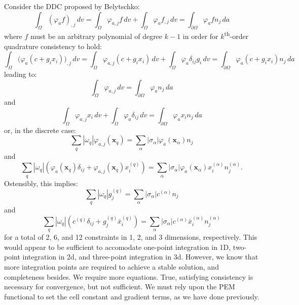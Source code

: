 \documentclass[11pt]{article} %
\begin{document}
Consider the DDC proposed by Belytschko:
\begin{equation}
	\int_{\Omega} (\varphi_{a} f)_{,j} \, dv = \int_{\Omega} \varphi_{a,j} f \, dv + \int_{\Omega} \varphi_{a} f_{,j} \, dv = \int_{\partial \Omega} \varphi_a f n_j \, da
\end{equation}
where $f$ must be an arbitrary polynomial of degree $k-1$ in order for $k$\textsuperscript{th}-order quadrature consistency to hold:
\begin{equation}
	\int_{\Omega} \big(\varphi_{a} (c + g_i x_i) \big)_{,j} \, dv = \int_{\Omega} \varphi_{a,j} (c + g_i x_i) \, dv + \int_{\Omega} \varphi_{a} \delta_{ij} g_i \, dv = \int_{\partial \Omega} \varphi_a (c + g_i x_i) n_j \, da
\end{equation}
leading to:
\begin{equation}
	\int_{\Omega} \varphi_{a,j} \, dv = \int_{\partial \Omega} \varphi_a n_j \, da
\end{equation}
and
\begin{equation}
	\int_{\Omega} \varphi_{a,j} x_i \, dv + \int_{\Omega} \varphi_{a} \delta_{ij} \, dv = \int_{\partial \Omega} \varphi_a x_i n_j \, da
\end{equation}
or, in the discrete case:
\begin{equation}
	\sum_q | \omega_q | \varphi_{a,j} ( \mathbf{x}_q ) = \sum_{\alpha} | \sigma_\alpha | \varphi_a ( \mathbf{x}_\alpha ) n_j
\end{equation}
and
\begin{equation}
	\sum_q | \omega_q | (\varphi_{a} ( \mathbf{x}_q ) \delta_{ij} + \varphi_{a,j} ( \mathbf{x}_q ) x^{(q)}_i) = \sum_{\alpha} | \sigma_\alpha | \varphi_a ( \mathbf{x}_\alpha ) x^{(\alpha)}_i n^{(\alpha)}_j .
\end{equation}
Ostensibly, this implies:
\begin{equation}
	\sum_q | \omega_q | g^{(q)}_j = \sum_{\alpha} | \sigma_\alpha | c^{(\alpha)} n_j
\end{equation}
and
\begin{equation}
	\sum_q | \omega_q | (c^{(q)} \delta_{ij} + g^{(q)}_j \bar{x}^{(q)}_i) = \sum_{\alpha} | \sigma_\alpha | c^{(\alpha)} \bar{x}^{(\alpha)}_i n^{(\alpha)}_j
\end{equation}
for a total of 2, 6, and 12 constraints in 1, 2, and 3 dimensions, respectively. This would appear to be sufficient to accomodate one-point integration in 1D, two-point integration in 2d, and three-point integration in 3d. However, we know that more integration points are required to achieve a stable solution, and completeness besides. We require more equations. True, satisfying consistency is necessary for convergence, but not sufficient. We must rely upon the PEM functional to set the cell constant and gradient terms, as we have done previously.
\end{document}
